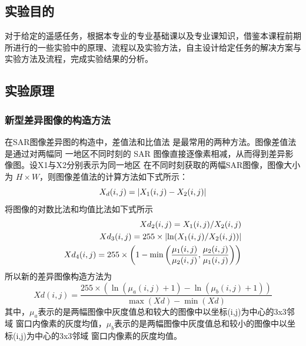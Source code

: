 \subsection{实验目的}
对于给定的遥感任务，根据本专业的专业基础课以及专业课知识，借鉴本课程前期所进行的一些实验中的原理、流程以及实验方法，自主设计给定任务的解决方案与实验方法及流程，完成实验结果的分析。
\subsection{实验原理}
\subsubsection{新型差异图像的构造方法}
在SAR图像差异图的构造中，差值法和比值法 是最常用的两种方法。图像差值法是通过对两幅同 一地区不同时刻的 SAR 图像直接逐像素相减，从而得到差异影像图。设X1与X2分别表示为同一地区 在不同时刻获取的两幅SAR图像，图像大小为
$H\times W$，则图像差值法的计算方法如下式所示：
\begin{equation}
X_d(i, j) = \left| X_1(i, j) - X_2(i, j) \right|
\end{equation}
将图像的对数比法和均值比法如下式所示
\begin{eqnarray}
Xd_2(i, j) = X_1(i, j)/X_2(i, j) \\
Xd_3(i, j) = 255\times\left| \ln(X_1(i, j)/X_2(i, j)) \right| \\
Xd_4(i, j) = 255\times\left( 1-\min\left(\frac{\mu_1(i, j)}{\mu_2(i, j)}, \frac{\mu_2(i, j)}{\mu_1(i, j)}\right) \right)
\end{eqnarray}
所以新的差异图像构造方法为
\begin{equation}
Xd(i, j) = \frac{255\times(\ln(\mu_a(i, j) + 1) - \ln(\mu_b(i, j) + 1))}{\max(Xd) - \min(Xd)}
\end{equation}
其中，$\mu_a$表示的是两幅图像中灰度值总和较大的图像中以坐标(i,j)为中心的3x3邻域 窗口内像素的灰度均值，$\mu_b$表示的是两幅图像中灰度值总和较小的图像中以坐标(i,j)为中心的3x3邻域 窗口内像素的灰度均值。
